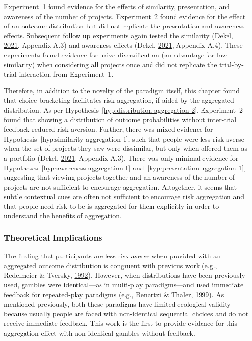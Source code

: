 \documentclass[
  english,
  man, donotrepeattitle,floatsintext]{apa7}
\theoremstyle{definition}
\theoremstyle{definition}
\theoremstyle{definition}
\theoremstyle{definition}
\theoremstyle{remark}
\begin{document}
Experiment~1 found evidence for the effects of similarity, presentation, and
awareness of the number of projects. Experiment~2 found evidence for the effect
of an outcome distribution but did not replicate the presentation and awareness
effects. Subsequent follow up experiments again tested the similarity
(Dekel, \protect\hyperlink{ref-dekel2021b}{2021}, Appendix A.3) and awareness effects (Dekel, \protect\hyperlink{ref-dekel2021b}{2021}, Appendix
A.4). These experiments found evidence for naive diversification (an advantage
for low similarity) when considering all projects once and did not replicate the
trial-by-trial interaction from Experiment~1.

Therefore, in addition to the novelty of the paradigm itself, this chapter found
that choice bracketing facilitates risk aggregation, if aided by the aggregated
distribution. As per Hypothesis~\ref{hyp:distribution-aggregation-2},
Experiment~2 found that showing a distribution of outcome probabilities without
inter-trial feedback reduced risk aversion. Further, there was mixed evidence
for Hypothesis~\ref{hyp:similarity-aggregation-1}, such that people were less
risk averse when the set of projects they saw were dissimilar, but only when
offered them as a portfolio (Dekel, \protect\hyperlink{ref-dekel2021b}{2021}, Appendix A.3). There was only
minimal evidence for Hypotheses~\ref{hyp:awareness-aggregation-1}
and~\ref{hyp:presentation-aggregation-1}, suggesting that viewing projects
together and an awareness of the number of projects are not sufficient to
encourage aggregation. Altogether, it seems that subtle contextual cues are
often not sufficient to encourage risk aggregation and that people need risk to
be is aggregated for them explicitly in order to understand the benefits of
aggregation.

\hypertarget{theoretical-implications}{%
\subsubsection{Theoretical Implications}\label{theoretical-implications}}

The finding that participants are less risk averse when provided with an
aggregated outcome distribution is congruent with previous work (e.g., Redelmeier \& Tversky, \protect\hyperlink{ref-redelmeier1992}{1992}). However, when distributions have been previously used, gambles
were identical---as in multi-play paradigms---and used immediate feedback for
repeated-play paradigms (e.g., Benartzi \& Thaler, \protect\hyperlink{ref-benartzi1999}{1999}). As mentioned previously, both
these paradigms have limited ecological validity because usually people are
faced with non-identical sequential choices and do not receive immediate
feedback. This work is the first to provide evidence for this aggregation effect
with non-identical gambles without feedback.
\end{document}
